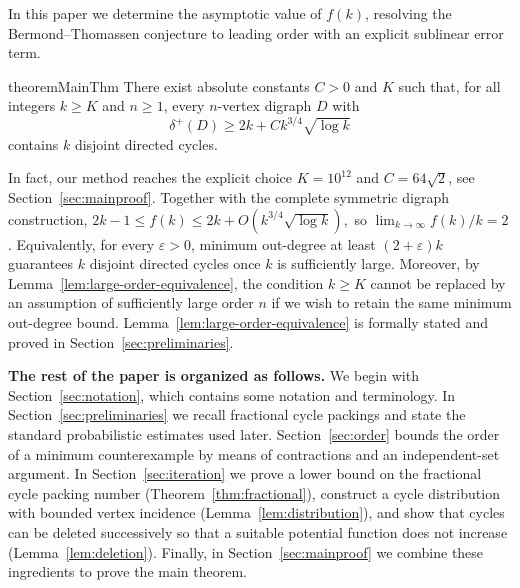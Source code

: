 \documentclass[10pt,a4paper]{article}
\newtheorem{theorem}{Theorem}[section]
\numberwithin{equation}{section}
\newcommand{\jbjcomment}[1]{\textcolor{blue}{JBJ: #1}}
\begin{document}
\medskip
In this paper we determine the asymptotic value of $f(k)$, resolving
the Bermond--Thomassen conjecture to leading order with an explicit
sublinear error term.%



\begin{restatable}{theorem}{MainThm}\label{thm:main}
    There exist absolute constants $C>0$ and $K$ such that, for all
integers $k\ge K$ and $n\ge1$, every $n$-vertex digraph $D$ with
$$
\delta^+(D)\ge 2k+Ck^{3/4}\sqrt{\log k}
$$
contains $k$ disjoint directed cycles.
\end{restatable}

In fact, our method reaches the explicit choice
$K=10^{12}$ and $C=64\sqrt2$, see Section~\ref{sec:mainproof}.   Together with the complete symmetric digraph construction,
$ 2k-1\le f(k)\le 2k+O\!\left(k^{3/4}\sqrt{\log k}\right), $
so $\lim_{k\to\infty}f(k)/k=2$. Equivalently, for every $\varepsilon>0$, minimum out-degree at least $(2+\varepsilon)k$ guarantees $k$ disjoint directed cycles once $k$ is sufficiently large. Moreover, by Lemma~\ref{lem:large-order-equivalence}, the condition $k\ge K$ cannot be replaced by an assumption of sufficiently large order $n$ if we wish to retain the same minimum out-degree bound.  Lemma~\ref{lem:large-order-equivalence} is formally stated and proved in Section~\ref{sec:preliminaries}.

\bigskip
\textbf{The rest of the paper is organized as follows.}
We begin with Section~\ref{sec:notation}, which contains some notation and terminology.
In Section~\ref{sec:preliminaries} we recall fractional cycle packings and state the standard probabilistic estimates used later. 
Section~\ref{sec:order} bounds the order of a minimum counterexample
by means of contractions and an independent-set argument.
In Section~\ref{sec:iteration} we prove a lower bound on the fractional
cycle packing number (Theorem~\ref{thm:fractional}), construct a cycle
distribution with bounded vertex incidence
(Lemma~\ref{lem:distribution}), and show that cycles can be deleted
successively so that a suitable potential function does not increase
(Lemma~\ref{lem:deletion}). Finally, in Section~\ref{sec:mainproof} we
combine these ingredients to prove the main theorem.
\end{document}
